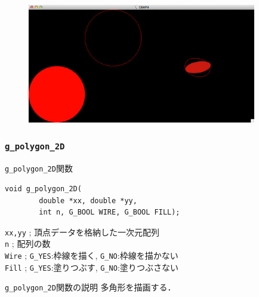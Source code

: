 \documentclass[platex,a4paper,12pt]{jsarticle}%
\begin{document}
\begin{figure}[htb]
\centering
	\includegraphics[width=100mm]{./Figures/eps/Canvas_g_circle2.eps}
\end{figure}




\clearpage
\subsubsection{\texttt{g\_polygon\_2D}}

\begin{itembox}[l]{\texttt{g\_polygon\_2D}関数}
\begin{verbatim}
void g_polygon_2D(
        double *xx, double *yy,
        int n, G_BOOL WIRE, G_BOOL FILL);
\end{verbatim}
\verb|xx,yy| ; 頂点データを格納した一次元配列\\
\verb|n| ; 配列の数\\
\verb|Wire| ; \verb|G_YES|:枠線を描く, \verb|G_NO|:枠線を描かない \\
\verb|Fill| ; \verb|G_YES|:塗りつぶす, \verb|G_NO|:塗りつぶさない 
\end{itembox}

\begin{itembox}[l]{\texttt{g\_polygon\_2D}関数の説明}
多角形を描画する．
\end{itembox}
\end{document}
